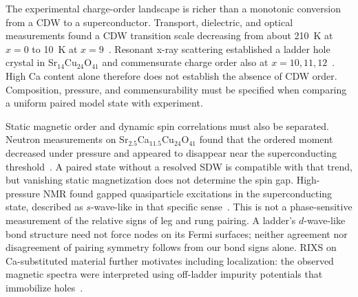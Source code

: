 \documentclass[11pt,letterpaper]{article}
\begin{document}
The experimental charge-order landscape is richer than a monotonic conversion
from a CDW to a superconductor. Transport, dielectric, and optical measurements
found a CDW transition scale decreasing from about 210~K at $x=0$ to 10~K at
$x=9$~\citep{Vuletic2003}. Resonant x-ray scattering established a ladder
hole crystal in Sr$_{14}$Cu$_{24}$O$_{41}$ and commensurate charge order also
at $x=10,11,12$~\citep{Abbamonte2004,Rusydi2006}. High Ca content alone
therefore does not establish the absence of CDW order. Composition, pressure,
and commensurability must be specified when comparing a uniform paired model
state with experiment.

Static magnetic order and dynamic spin correlations must also be separated.
Neutron measurements on Sr$_{2.5}$Ca$_{11.5}$Cu$_{24}$O$_{41}$ found that the
ordered moment decreased under pressure and appeared to disappear near the
superconducting threshold~\citep{Katano1999}. A paired state without a
resolved SDW is compatible with that trend, but vanishing static magnetization
does not determine the spin gap. High-pressure NMR found gapped quasiparticle
excitations in the superconducting state, described as $s$-wave-like in that
specific sense~\citep{Fujiwara2003}. This is not a phase-sensitive measurement
of the relative signs of leg and rung pairing. A ladder's $d$-wave-like bond
structure need not force nodes on its Fermi surfaces; neither agreement nor
disagreement of pairing symmetry follows from our bond signs alone.
RIXS on Ca-substituted material further motivates including localization:
the observed magnetic spectra were interpreted using off-ladder impurity
potentials that immobilize holes~\citep{Tseng2022}.
\end{document}
